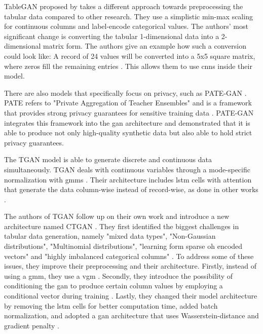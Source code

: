 TableGAN proposed by \textcite{park2018DataSynthesisBased} takes a different approach towards preprocessing the tabular data compared to other research.
They use a simplistic min-max scaling for continuous columns and label-encode categorical values.
The authors' most significant change is converting the tabular 1-dimensional data into a 2-dimensional matrix form.
The authors give an example how such a conversion could look like:
A record of 24 values will be converted into a 5x5 square matrix, where zeros fill the remaining entries \cite[p-4]{park2018DataSynthesisBased}.
This allows them to use \glspl{cnn} inside their \gls{model}.

There are also models that specifically focus on privacy, such as PATE-GAN  \cite{jordon2018PATEGANGeneratingSynthetic}.
PATE refers to "Private Aggregation of Teacher Ensembles" \cite{papernot2017SemisupervisedKnowledgeTransfer} and is a framework that provides strong privacy guarantees for sensitive training data \cite{jordon2018PATEGANGeneratingSynthetic}.
PATE-GAN integrates this framework into the \gls{gan} architecture and demonstrated that it is able to produce not only high-quality synthetic data but also able to hold strict privacy guarantees.

The TGAN \cite{xu2018SynthesizingTabularData} \gls{model} is able to generate discrete and continuous data simultaneously.
TGAN deals with continuous variables through a mode-specific normalization with \glspl{gmm} \cite[p. 3]{xu2018SynthesizingTabularData}.
Their architecture includes \gls{lstm} cells with attention that generate the data column-wise instead of record-wise, as done in other works \cite{xu2018SynthesizingTabularData}.

The authors of TGAN follow up on their own work and introduce a new architecture named CTGAN \cite{xu2019ModelingTabularData}.
They first identified the biggest challenges in tabular data generation, namely "mixed data types", "Non-Gaussian distributions", "Multinomial distributions", "learning form sparse \gls{oh} encoded vectors" and "highly imbalanced categorical columns" \cite[p. 3]{xu2019ModelingTabularData}.
To address some of these issues, they improve their preprocessing and their architecture.
Firstly, instead of using a \acrfull{gmm}, they use a \acrfull{vgm} \cite{xu2019ModelingTabularData}.
Secondly, they introduce the possibility of conditioning the \gls{gan} to produce certain column values by employing a conditional vector during training \cite{xu2019ModelingTabularData}.
Lastly, they changed their \gls{model} architecture by removing the \gls{lstm} cells for better computation time, added batch normalization, 
and adopted a \gls{gan} architecture that uses Wasserstein-distance and gradient penalty \cite{gulrajani2017ImprovedTrainingWasserstein}.

